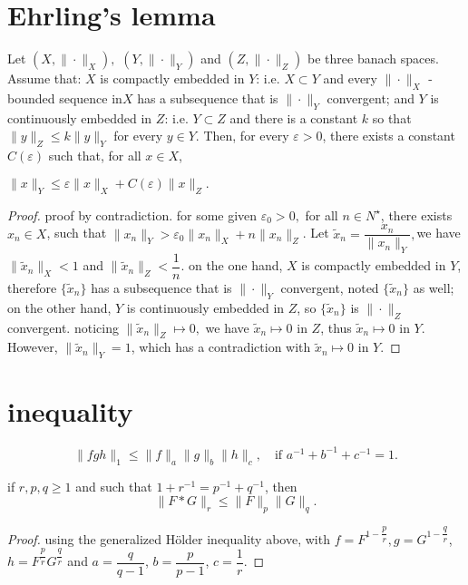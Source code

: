 \section{Ehrling's lemma}
\begin{lemma}
	Let $(X,\|\cdot\|_X),$ $(Y,\|\cdot\|_Y)$ and $(Z,\|\cdot\|_Z)$ be three banach spaces. Assume that:
	$X$ is compactly embedded in $Y$: i.e. $X \subset Y$ and every $\|\cdot\|_X$ -bounded sequence in$ X$ has a subsequence that is $\|\cdot\|_Y$ convergent; and
	$Y$ is continuously embedded in $Z$: i.e. $Y \subset Z$ and there is a constant $k$ so that 
	$\|y\|_Z \leqslant k\|y\|_Y$ for every $y \in Y$.
	Then, for every $\varepsilon > 0$, there exists a constant $C(\varepsilon)$ such that, for all $x \in X$,
	
	${\displaystyle \|x\|_{Y}\leqslant \varepsilon \|x\|_{X}+C(\varepsilon )\|x\|_{Z}}.$
\end{lemma}

\begin{proof}
	proof by contradiction.
	for some given $\varepsilon_0 > 0,$ for all $n \in N^ \star$, there exists $x_n \in X$, such that
	$\|x_n\|_{Y} > \varepsilon_0 \|x_n\|_{X}+n\|x_n\|_{Z}$. 
	Let $\tilde{x}_n=\dfrac{x_n}{\|x_n\|_Y},$we have $\|\tilde{x}_n\|_X < 1$ and $\|\tilde{x}_n\|_Z < \dfrac{1}{n}$. 
	on the one hand, $X$ is compactly embedded in $Y$, 
	therefore $\{\tilde{x}_n\}$ has a subsequence that is $\|\cdot\|_Y$ convergent, 
	noted $\{\tilde{x}_n\}$ as well; 
	on the other hand, $Y$ is continuously embedded in $Z$, 
	so $\{\tilde{x}_n\}$ is $\|\cdot\|_Z$ convergent. 
	noticing $\|\tilde{x}_n\|_Z\mapsto0,$ 
	we have $ \tilde{x}_n \mapsto 0 $ in $Z$, 
	thus $ \tilde{x}_n \mapsto 0 $ in $Y$. 
	However, $\|\tilde{x}_n\|_Y=1$, 
	which has a contradiction with $ \tilde{x}_n \mapsto 0 $ in $Y$.
\end{proof}

\section{inequality}
\begin{lemma}
	\begin{equation}
		\|fgh\|_1\leqslant \|f\|_a \|g\|_b \|h\|_c, \quad \text{if } a^{-1} +b^{-1} + c^{-1}=1.
	\end{equation}
\end{lemma}
\begin{lemma}
	\label{le: Young inequality for convolutions}
	if $r,p,q\geqslant1$ and such that $1+r^{-1} = p^{-1}+q^{-1}$, then
	\begin{equation}
		\|F*G\|_r\leqslant\|F\|_p\|G\|_q.
	\end{equation}
	\end{lemma}
\begin{proof}
	using the generalized H\"older inequality above, 
	with $f=F^{1-\dfrac{p}{r}},g=G^{1-\dfrac{q}{r}}$, $h=F^{\dfrac{p}{r}}G^{\dfrac{q}{r}}$ and $a=\dfrac{q}{q-1}$, $b=\dfrac{p}{p-1}$, $c= \dfrac{1}{r}$.
\end{proof}



